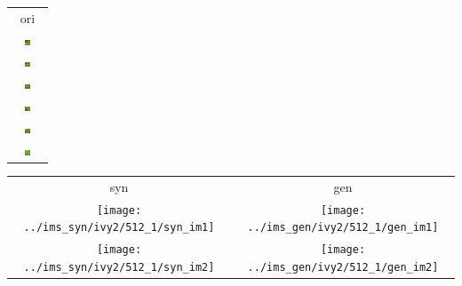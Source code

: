 \documentclass[letter]{article}
\begin{document}
\begin{table}[h!]
	\centering
	\begin{tabular}{c}
		ori\tabularnewline
		\includegraphics[width=0.17\textwidth]{../data/ivy2/512/1} \tabularnewline		\includegraphics[width=0.17\textwidth]{../data/ivy2/512/2} \tabularnewline		\includegraphics[width=0.17\textwidth]{../data/ivy2/512/3} \tabularnewline		\includegraphics[width=0.17\textwidth]{../data/ivy2/512/4} \tabularnewline		\includegraphics[width=0.17\textwidth]{../data/ivy2/512/5} \tabularnewline		\includegraphics[width=0.17\textwidth]{../data/ivy2/512/6} \tabularnewline
	\end{tabular}
	\begin{tabular}{cc}
		syn & gen\tabularnewline
		\texttt{[image: ../ims\_syn/ivy2/512\_1/syn\_im1]} & \texttt{[image: ../ims\_gen/ivy2/512\_1/gen\_im1]} \tabularnewline
		\texttt{[image: ../ims\_syn/ivy2/512\_1/syn\_im2]} & \texttt{[image: ../ims\_gen/ivy2/512\_1/gen\_im2]} \tabularnewline

\end{tabular}
\end{table}
\end{document}
